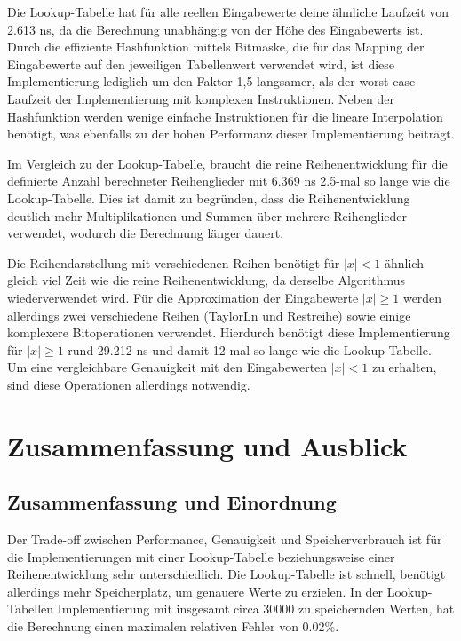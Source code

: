 \documentclass[course=erap] {aspdoc}
\begin{document}
    Die Lookup-Tabelle hat für alle reellen Eingabewerte deine ähnliche Laufzeit von 2.613 ns, da die Berechnung unabhängig von der Höhe des Eingabewerts ist.
    Durch die effiziente Hashfunktion mittels Bitmaske, die für das Mapping der Eingabewerte auf den jeweiligen Tabellenwert verwendet wird, ist diese Implementierung lediglich um den Faktor 1,5 langsamer, als der worst-case Laufzeit der Implementierung mit komplexen Instruktionen.
    Neben der Hashfunktion werden wenige einfache Instruktionen für die lineare Interpolation benötigt, was ebenfalls zu der hohen Performanz dieser Implementierung beiträgt.

    Im Vergleich zu der Lookup-Tabelle, braucht die reine Reihenentwicklung für die definierte Anzahl berechneter Reihenglieder mit 6.369 ns 2.5-mal so lange wie die Lookup-Tabelle.
    Dies ist damit zu begründen, dass die Reihenentwicklung deutlich mehr Multiplikationen und Summen über mehrere Reihenglieder verwendet, wodurch die Berechnung länger dauert.

    Die Reihendarstellung mit verschiedenen Reihen benötigt für $|x|<1$ ähnlich gleich viel Zeit wie die reine Reihenentwicklung, da derselbe Algorithmus wiederverwendet wird.
    Für die Approximation der Eingabewerte $|x|\geq1$ werden allerdings zwei verschiedene Reihen (TaylorLn und Restreihe) sowie einige komplexere Bitoperationen verwendet.
    Hierdurch benötigt diese Implementierung für $|x|\geq1$ rund 29.212 ns und damit 12-mal so lange wie die Lookup-Tabelle.
    Um eine vergleichbare Genauigkeit mit den Eingabewerten $|x|<1$ zu erhalten, sind diese Operationen allerdings notwendig.


    \section{Zusammenfassung und Ausblick}\label{sec:zusammenfassung-und-ausblick}

    \subsection{Zusammenfassung und Einordnung}\label{subsec:zusammenfassung}

    Der Trade-off zwischen Performance, Genauigkeit und Speicherverbrauch ist für die Implementierungen mit einer Lookup-Tabelle beziehungsweise einer Reihenentwicklung sehr unterschiedlich.
    Die Lookup-Tabelle ist schnell, benötigt allerdings mehr Speicherplatz, um genauere Werte zu erzielen.
    In der Lookup-Tabellen Implementierung mit insgesamt circa 30000 zu speichernden Werten, hat die Berechnung einen maximalen relativen Fehler von 0.02\%.
\end{document}
